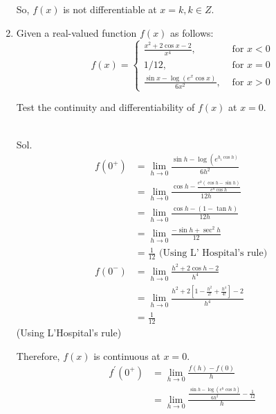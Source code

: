 \begin{enumerate}
\begin{outline}
So, $f(x)$ is not differentiable at $x=k, k \in Z$.
\end{outline}


\item Given a real-valued function $f(x)$ as follows:
$$
f(x)= \begin{cases}\frac{x^2+2 \cos x-2}{x^4}, & \text { for } x<0 \\ 1 / 12, & \text { for } x=0 \\ \frac{\sin x-\log \left(e^x \cos x\right)}{6 x^2}, & \text { for } x>0\end{cases}
$$

Test the continuity and differentiability of $f(x)$ at $x=0$.\\\\


\begin{outline}
    Sol.
$$
\begin{aligned}
f\left(0^{+}\right) & =\lim _{h \rightarrow 0} \frac{\sin h-\log \left(e^{\left.h_i \cos h\right)}\right.}{6 h^2} \\
& =\lim _{h \rightarrow 0} \frac{\cos h-\frac{e^h(\cos h-\sin h)}{e^h \cos h}}{12 h} \\
& =\lim _{h \rightarrow 0} \frac{\cos h-(1-\tan h)}{12 h} \\
& =\lim _{h \rightarrow 0} \frac{-\sin h+\sec ^2 h}{12} \\
& =\frac{1}{12} \text { (Using L' Hospital's rule) } \\
f\left(0^{-}\right) & =\lim _{h \rightarrow 0} \frac{h^2+2 \cos h-2}{h^4} \\
& =\lim _{h \rightarrow 0} \frac{h^2+2\left[1-\frac{h^2}{2 !}+\frac{h^4}{4 !}\right]-2}{h^4} \\
& =\frac{1}{12}
\end{aligned}
$$
(Using L'Hospital's rule)

Therefore, $f(x)$ is continuous at $x=0$.
$$
\begin{aligned}
f^{\prime}\left(0^{+}\right) & =\lim _{h \rightarrow 0} \frac{f(h)-f(0)}{h} \\
& =\lim _{h \rightarrow 0} \frac{\frac{\sin h-\log \left(e^h \cos h\right)}{6 h^2}-\frac{1}{12}}{h}
\end{aligned}
$$



\end{outline}
\end{enumerate}
